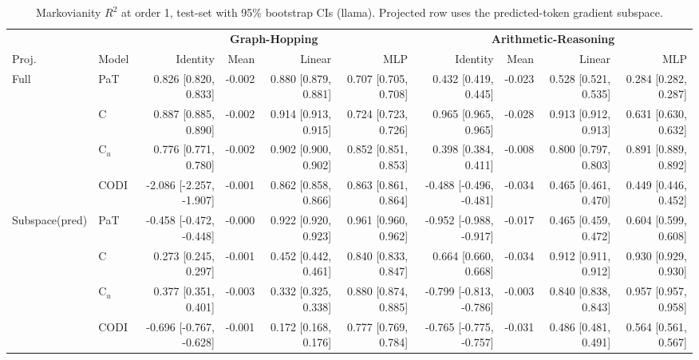 \begin{table}[h!]
\centering
\tiny
\setlength{\tabcolsep}{4pt}
\begin{tabular}{llrrrrrrrr}
\toprule
& & \multicolumn{4}{c}{\textbf{Graph-Hopping}} & \multicolumn{4}{c}{\textbf{Arithmetic-Reasoning}} \\
\cmidrule(lr){3-6}\cmidrule(lr){7-10}
Proj. & Model & Identity & Mean & Linear & MLP & Identity & Mean & Linear & MLP \\
\midrule
\multirow{4}{*}{Full} & PaT & 0.826 [0.820, 0.833] & -0.002 & 0.880 [0.879, 0.881] & 0.707 [0.705, 0.708] & 0.432 [0.419, 0.445] & -0.023 & 0.528 [0.521, 0.535] & 0.284 [0.282, 0.287] \\
 & C & 0.887 [0.885, 0.890] & -0.002 & 0.914 [0.913, 0.915] & 0.724 [0.723, 0.726] & 0.965 [0.965, 0.965] & -0.028 & 0.913 [0.912, 0.913] & 0.631 [0.630, 0.632] \\
 & C$_u$ & 0.776 [0.771, 0.780] & -0.002 & 0.902 [0.900, 0.902] & 0.852 [0.851, 0.853] & 0.398 [0.384, 0.411] & -0.008 & 0.800 [0.797, 0.803] & 0.891 [0.889, 0.892] \\
 & CODI & -2.086 [-2.257, -1.907] & -0.001 & 0.862 [0.858, 0.866] & 0.863 [0.861, 0.864] & -0.488 [-0.496, -0.481] & -0.034 & 0.465 [0.461, 0.470] & 0.449 [0.446, 0.452] \\
\midrule
\multirow{4}{*}{Subspace(pred)} & PaT & -0.458 [-0.472, -0.448] & -0.000 & 0.922 [0.920, 0.923] & 0.961 [0.960, 0.962] & -0.952 [-0.988, -0.917] & -0.017 & 0.465 [0.459, 0.472] & 0.604 [0.599, 0.608] \\
 & C & 0.273 [0.245, 0.297] & -0.001 & 0.452 [0.442, 0.461] & 0.840 [0.833, 0.847] & 0.664 [0.660, 0.668] & -0.034 & 0.912 [0.911, 0.912] & 0.930 [0.929, 0.930] \\
 & C$_u$ & 0.377 [0.351, 0.401] & -0.003 & 0.332 [0.325, 0.338] & 0.880 [0.874, 0.885] & -0.799 [-0.813, -0.786] & -0.003 & 0.840 [0.838, 0.843] & 0.957 [0.957, 0.958] \\
 & CODI & -0.696 [-0.767, -0.628] & -0.001 & 0.172 [0.168, 0.176] & 0.777 [0.769, 0.784] & -0.765 [-0.775, -0.757] & -0.031 & 0.486 [0.481, 0.491] & 0.564 [0.561, 0.567] \\
\bottomrule
\end{tabular}
\caption{Markovianity $R^2$ at order 1, test-set with 95\% bootstrap CIs (llama). Projected row uses the predicted-token gradient subspace.}
\label{tab:markovianity_llama_pred}
\end{table}
